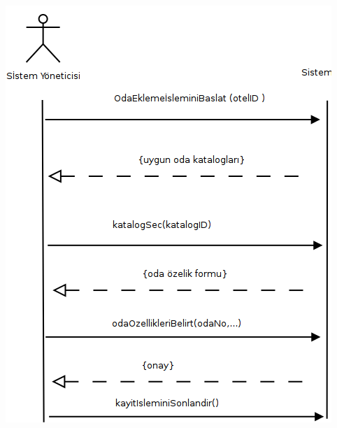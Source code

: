 \documentclass[12pt,a4paper]{report}
\begin{document}
\newpage

\begin{center}
\includegraphics{dia/ssd-usecase3.png}
\end{center}
\end{document}
